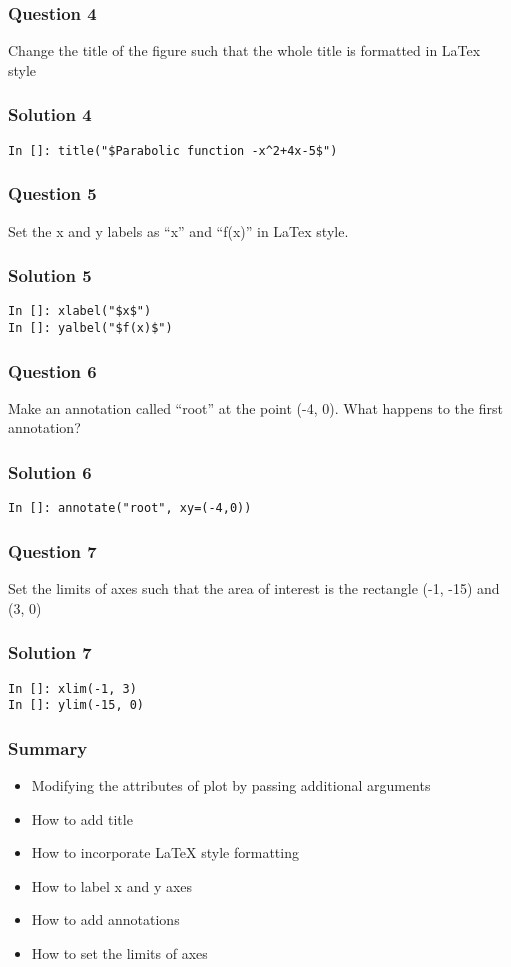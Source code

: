 \documentclass[presentation]{beamer}
\begin{document}
\begin{frame}
\frametitle{Question 4}
\label{sec-8}

  Change the title of the figure such that the whole title is
  formatted in LaTex style
\end{frame}
\begin{frame}[fragile]
\frametitle{Solution 4}
\label{sec-9}

\lstset{language=Python}
\begin{lstlisting}
In []: title("$Parabolic function -x^2+4x-5$")
\end{lstlisting}
\end{frame}
\begin{frame}
\frametitle{Question 5}
\label{sec-10}

  Set the x and y labels as ``x'' and ``f(x)'' in LaTex style.
\end{frame}
\begin{frame}[fragile]
\frametitle{Solution 5}
\label{sec-11}

\lstset{language=Python}
\begin{lstlisting}
In []: xlabel("$x$")
In []: yalbel("$f(x)$")
\end{lstlisting}
\end{frame}
\begin{frame}
\frametitle{Question 6}
\label{sec-12}

  Make an annotation called ``root'' at the point (-4, 0). What happens
  to the first annotation?
\end{frame}
\begin{frame}[fragile]
\frametitle{Solution 6}
\label{sec-13}

\lstset{language=Python}
\begin{lstlisting}
In []: annotate("root", xy=(-4,0))
\end{lstlisting}
\end{frame}
\begin{frame}
\frametitle{Question 7}
\label{sec-14}

  Set the limits of axes such that the area of interest is the
  rectangle (-1, -15) and (3, 0)
\end{frame}
\begin{frame}[fragile]
\frametitle{Solution 7}
\label{sec-15}

\lstset{language=Python}
\begin{lstlisting}
In []: xlim(-1, 3)
In []: ylim(-15, 0)
\end{lstlisting}
\end{frame}
\begin{frame}
\frametitle{Summary}
\label{sec-16}

\begin{itemize}
\item Modifying the attributes of plot by passing additional arguments
\item How to add title
\item How to incorporate \LaTeX{} style formatting
\item How to label x and y axes
\item How to add annotations
\item How to set the limits of axes
\end{itemize}
\end{frame}
\end{document}
